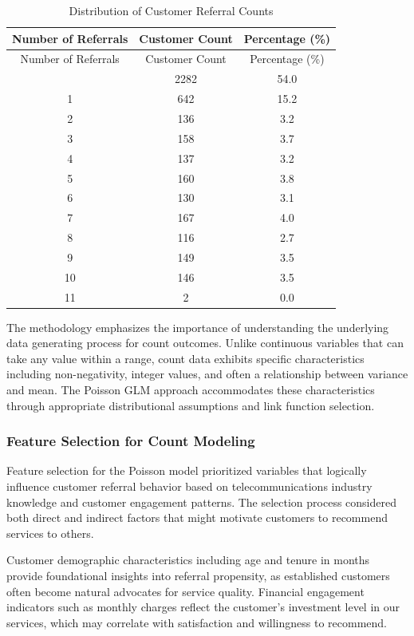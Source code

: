 \documentclass[
]{article}
\begin{document}
\begin{longtable}[]{@{}ccc@{}}
\caption{Distribution of Customer Referral Counts}\tabularnewline
\toprule\noalign{}
Number of Referrals & Customer Count & Percentage (\%) \\
\midrule\noalign{}
\endfirsthead
\toprule\noalign{}
Number of Referrals & Customer Count & Percentage (\%) \\
\midrule\noalign{}
\endhead
\bottomrule\noalign{}
\endlastfoot
0 & 2282 & 54.0 \\
1 & 642 & 15.2 \\
2 & 136 & 3.2 \\
3 & 158 & 3.7 \\
4 & 137 & 3.2 \\
5 & 160 & 3.8 \\
6 & 130 & 3.1 \\
7 & 167 & 4.0 \\
8 & 116 & 2.7 \\
9 & 149 & 3.5 \\
10 & 146 & 3.5 \\
11 & 2 & 0.0 \\
\end{longtable}

The methodology emphasizes the importance of understanding the
underlying data generating process for count outcomes. Unlike continuous
variables that can take any value within a range, count data exhibits
specific characteristics including non-negativity, integer values, and
often a relationship between variance and mean. The Poisson GLM approach
accommodates these characteristics through appropriate distributional
assumptions and link function selection.

\hypertarget{feature-selection-for-count-modeling}{%
\subsubsection{Feature Selection for Count
Modeling}\label{feature-selection-for-count-modeling}}

Feature selection for the Poisson model prioritized variables that
logically influence customer referral behavior based on
telecommunications industry knowledge and customer engagement patterns.
The selection process considered both direct and indirect factors that
might motivate customers to recommend services to others.

Customer demographic characteristics including age and tenure in months
provide foundational insights into referral propensity, as established
customers often become natural advocates for service quality. Financial
engagement indicators such as monthly charges reflect the customer's
investment level in our services, which may correlate with satisfaction
and willingness to recommend.
\end{document}
